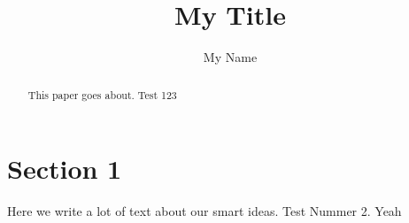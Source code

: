 \documentclass{article}
\begin{document}
\title{My Title}
\author{My Name}
\maketitle

\begin{abstract}
This paper goes about.
Test 123
\end{abstract}

\section{Section 1}
Here we write a lot of text about our smart ideas.
\cite{Eckert2007}
Test Nummer 2. Yeah


\end{document}
